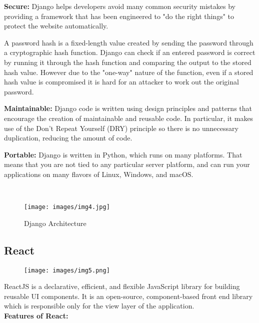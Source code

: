 \documentclass[12pt]{article}
\begin{document}
\hspace{1cm}\textbf{Secure: }Django helps developers avoid many common security mistakes by providing a framework that has been engineered to "do the right things" to protect the website automatically. 
 
A password hash is a fixed-length value created by sending the password through a cryptographic hash function. Django can check if an entered password is correct by running it through the hash function and comparing the output to the stored hash value. However due to the "one-way" nature of the function, even if a stored hash value is compromised it is hard for an attacker to work out the original password. 
\\ \smallskip

\hspace{1cm}\textbf{Maintainable:} Django code is written using design principles and patterns that encourage the creation of maintainable and reusable code. In particular, it makes use of the Don't Repeat Yourself (DRY) principle so there is no unnecessary duplication, reducing the amount of code. \\ \smallskip

\hspace{1cm}\textbf{Portable:} Django is written in Python, which runs on many platforms. That means that you are not tied to any particular server platform, and can run your applications on many flavors of Linux, Windows, and macOS. 
 
\\
\smallskip

\begin{figure}[ht]
\centering
\texttt{[image: images/img4.jpg]}
\caption{Django Architecture }
\label{fig:example}
\end{figure}


\subsection{\large{React}}
\begin{figure}[ht]
\centering
\texttt{[image: images/img5.png]}
\label{fig:example}
\end{figure}
\hspace{1cm}ReactJS is a declarative, efficient, and flexible JavaScript library for building reusable UI components. It is an open-source, component-based front end library which is responsible only for the view layer of the application. \\ \smallskip
\textbf{Features of React: }\smallskip
\end{document}
